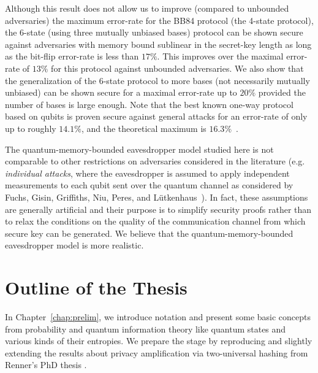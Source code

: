 Although this result does not allow us to improve (compared to
unbounded adversaries) the maximum error-rate for the BB84 protocol
(the 4-state protocol), the
6-state (using three mutually unbiased bases)
protocol can be shown secure against adversaries with memory bound
sublinear in the secret-key length as long as the bit-flip error-rate
is less than $17\%$. This improves over the maximal error-rate of
$13\%$ for this protocol against unbounded adversaries.  We also show
that the generalization of the 6-state protocol to more bases (not
necessarily mutually unbiased) can be shown secure for a maximal
error-rate up to $20\%$ provided the number of bases is large enough.
Note that the best known one-way protocol based on qubits is proven
secure against general attacks for an error-rate of only up to roughly
$14.1\%$, and the theoretical maximum is $16.3\%$~\cite{RGK05}.

The quantum-memory-bounded eavesdropper model studied here is not
comparable to other restrictions on adversaries considered in the
literature (e.g. \emph{individual attacks}, where the eavesdropper is
assumed to apply independent measurements to each qubit sent over the
quantum channel as considered by Fuchs, Gisin, Griffiths, Niu, Peres,
and L\"utkenhaus~\cite{FGGNP97,Lutkenhaus00}).  In fact, these
assumptions are generally artificial and their purpose is to simplify
security proofs rather than to relax the conditions on the quality of
the communication channel from which secure key can be generated.  We
believe that the quantum-memory-bounded eavesdropper model is more
realistic.



\section{Outline of the Thesis}
In Chapter~\ref{chap:prelim}, we introduce notation and present some
basic concepts from probability and quantum information theory like
quantum states and various kinds of their entropies. We prepare the
stage by reproducing and slightly extending the results about privacy
amplification via two-universal hashing from Renner's PhD thesis \cite{Renner05}.

